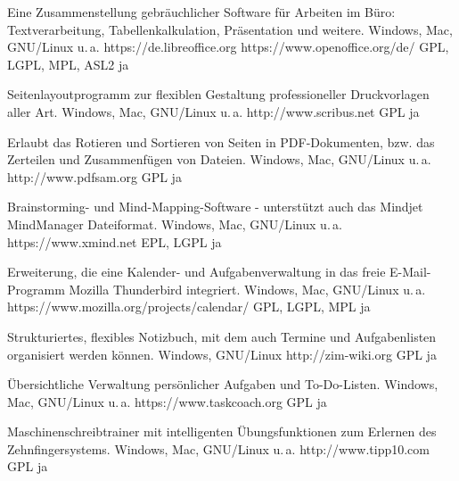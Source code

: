 





{Eine Zusammenstellung gebräuchlicher Software für Arbeiten im Büro: Textverarbeitung, Tabellenkalkulation, Präsentation und weitere.}
{Windows, Mac, GNU/Linux u.\,a.}
{https://de.libreoffice.org https://www.openoffice.org/de/}
{GPL, LGPL, MPL, ASL2}
{ja}

{Seitenlayoutprogramm zur flexiblen Gestaltung professioneller Druckvorlagen aller Art.}
{Windows, Mac, GNU/Linux u.\,a.}
{http://www.scribus.net}
{GPL}
{ja}

{Erlaubt das Rotieren und Sortieren von Seiten in PDF-Dokumenten, bzw. das Zerteilen und Zusammenfügen von Dateien.}
{Windows, Mac, GNU/Linux u.\,a.}
{http://www.pdfsam.org}
{GPL}
{ja}

{Brainstorming- und Mind-Mapping-Software - unterstützt auch das Mindjet MindManager Dateiformat.}
{Windows, Mac, GNU/Linux u.\,a.}
{https://www.xmind.net}
{EPL, LGPL}
{ja}

{Erweiterung, die eine Kalender- und Aufgabenverwaltung in das freie E-Mail-Programm Mozilla Thunderbird integriert.}
{Windows, Mac, GNU/Linux u.\,a.}
{https://www.mozilla.org/projects/calendar/}
{GPL, LGPL, MPL}
{ja}

{Strukturiertes, flexibles Notizbuch, mit dem auch Termine und Aufgabenlisten organisiert werden können.}
{Windows, GNU/Linux}
{http://zim-wiki.org}
{GPL}
{ja}

{Übersichtliche Verwaltung persönlicher Aufgaben und To-Do-Listen.}
{Windows, Mac, GNU/Linux u.\,a.}
{https://www.taskcoach.org}
{GPL}
{ja}


{Maschinenschreibtrainer mit intelligenten Übungsfunktionen zum Erlernen des Zehnfingersystems.}
{Windows, Mac, GNU/Linux u.\,a.}
{http://www.tipp10.com}
{GPL}
{ja}

\backpage


